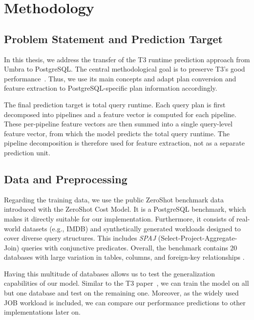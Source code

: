
\chapter{Methodology}\label{chapter:methodology}


\section{Problem Statement and Prediction Target}

In this thesis, we address the transfer of the T3 runtime prediction approach from Umbra to PostgreSQL.
The central methodological goal is to preserve T3’s good performance~\parencite{t3}.
Thus, we use its main concepts and adapt plan conversion and feature extraction to PostgreSQL-specific plan information accordingly.

The final prediction target is total query runtime.
Each query plan is first decomposed into pipelines and a feature vector is computed for each pipeline.
These per-pipeline feature vectors are then summed into a single query-level feature vector,
from which the model predicts the total query runtime.
The pipeline decomposition is therefore used for feature extraction,
not as a separate prediction unit.

\section{Data and Preprocessing}
Regarding the training data, we use the public ZeroShot benchmark data introduced with the ZeroShot Cost Model.
It is a PostgreSQL benchmark, which makes it directly suitable for our implementation.
Furthermore, it consists of real-world datasets (e.g., IMDB) and synthetically generated workloads designed to cover diverse query structures.
This includes \emph{SPAJ} (Select-Project-Aggregate-Join) queries with conjunctive predicates.
Overall, the benchmark contains 20 databases with large variation in tables, columns, and foreign-key relationships \parencite{zeroshot}.

Having this multitude of databases allows us to test the generalization capabilities of our model.
Similar to the T3 paper~\parencite{t3}, we can train the model on all but one database and test on the remaining one.
Moreover, as the widely used JOB workload is included, we can compare our performance predictions to other implementations later on.

